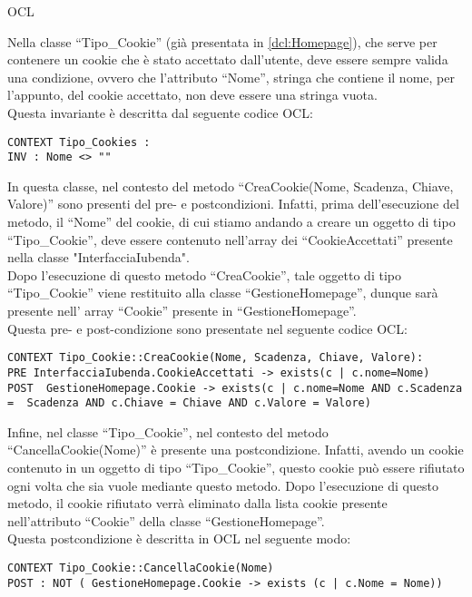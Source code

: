 \begin{listaPersonale}{OCL}
        \begin{center}
            
        \end{center}
        Nella classe “Tipo\_Cookie” (già presentata in \ref{dcl:Homepage}), che serve per contenere un cookie che è stato accettato dall’utente, deve essere sempre valida una condizione, ovvero che l’attributo “Nome”, stringa che contiene il nome, per l’appunto, del cookie accettato, non deve essere una stringa vuota.\\
        Questa invariante è descritta dal seguente codice OCL:
        \begin{lstlisting}
CONTEXT Tipo_Cookies :
INV : Nome <> "" 
    \end{lstlisting}
        In questa classe, nel contesto del metodo “CreaCookie(Nome, Scadenza, Chiave, Valore)” sono presenti del pre- e postcondizioni. Infatti, prima dell’esecuzione del metodo, il “Nome” del cookie, di cui stiamo andando a creare un oggetto di tipo “Tipo\_Cookie”, deve essere contenuto nell’array dei “CookieAccettati” presente nella classe "InterfacciaIubenda".\\
        Dopo l’esecuzione di questo metodo “CreaCookie”, tale oggetto di tipo “Tipo\_Cookie” viene restituito alla classe “GestioneHomepage”, dunque sarà presente nell’ array “Cookie” presente in “GestioneHomepage”.\\
        Questa pre- e post-condizione sono presentate nel seguente codice OCL:
        \begin{lstlisting}
CONTEXT Tipo_Cookie::CreaCookie(Nome, Scadenza, Chiave, Valore):
PRE InterfacciaIubenda.CookieAccettati -> exists(c | c.nome=Nome)
POST  GestioneHomepage.Cookie -> exists(c | c.nome=Nome AND c.Scadenza =  Scadenza AND c.Chiave = Chiave AND c.Valore = Valore) 
    \end{lstlisting}
        Infine, nel classe “Tipo\_Cookie”, nel contesto del metodo “CancellaCookie(Nome)” è presente una postcondizione. Infatti, avendo un cookie contenuto in un oggetto di tipo “Tipo\_Cookie”, questo cookie può essere rifiutato ogni volta che sia vuole mediante questo metodo. Dopo l’esecuzione di questo metodo, il cookie rifiutato verrà eliminato dalla lista cookie presente nell’attributo “Cookie” della classe “GestioneHomepage”.\\
        Questa postcondizione è descritta in OCL nel seguente modo:

        \begin{lstlisting}
CONTEXT Tipo_Cookie::CancellaCookie(Nome)
POST : NOT ( GestioneHomepage.Cookie -> exists (c | c.Nome = Nome))
    \end{lstlisting}


\end{listaPersonale}
